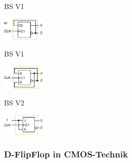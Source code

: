 \begin{center}
    \begin{minipage}[t]{0.3\linewidth}
        \begin{flushleft}
            BS V1
        \end{flushleft}
        \includegraphics[width = 20mm]{images/t_ff_cir_11.jpeg}
    \end{minipage}
    \hfill\vline\hfill
    \begin{minipage}[t]{0.3\linewidth}
        \begin{flushleft}
            BS V1
        \end{flushleft}
        \includegraphics[width = 20mm]{images/t_ff_cir_12.jpeg}
    \end{minipage}
    \hfill\vline\hfill
    \begin{minipage}[t]{0.3\linewidth}
        \begin{flushleft}
            BS V2
        \end{flushleft}
        \includegraphics[width = 20mm]{images/t_ff_cir_21.jpeg}
    \end{minipage}
\end{center}

\subsubsection{D-FlipFlop in CMOS-Technik}
